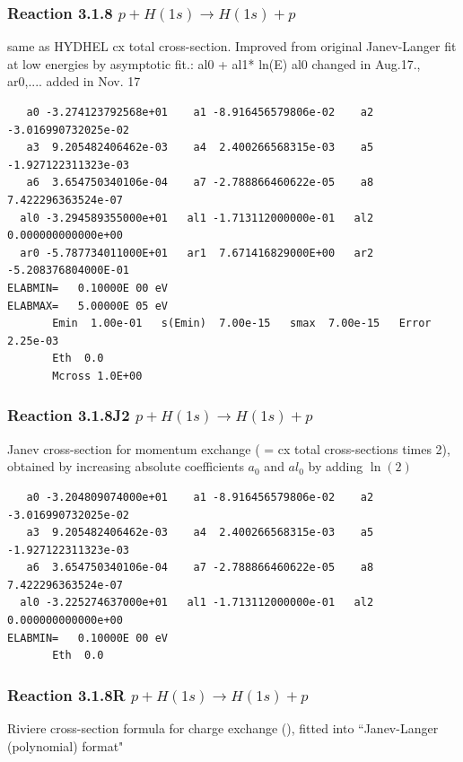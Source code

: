\documentclass[12pt,dvipdfmx]{article}
\begin{document}
\subsubsection{
Reaction 3.1.8 $  p + H(1s) \rightarrow H(1s) + p  $
}
same as HYDHEL cx total cross-section.
Improved from original Janev-Langer fit at low energies by asymptotic fit.:  al0 + al1* ln(E)
al0 changed in Aug.17., ar0,.... added in Nov. 17

\begin{small}\begin{verbatim}
   a0 -3.274123792568e+01    a1 -8.916456579806e-02    a2 -3.016990732025e-02
   a3  9.205482406462e-03    a4  2.400266568315e-03    a5 -1.927122311323e-03
   a6  3.654750340106e-04    a7 -2.788866460622e-05    a8  7.422296363524e-07
  al0 -3.294589355000e+01   al1 -1.713112000000e-01   al2  0.000000000000e+00
  ar0 -5.787734011000E+01   ar1  7.671416829000E+00   ar2 -5.208376804000E-01
ELABMIN=   0.10000E 00 eV
ELABMAX=   5.00000E 05 eV
       Emin  1.00e-01   s(Emin)  7.00e-15   smax  7.00e-15   Error  2.25e-03
       Eth  0.0
       Mcross 1.0E+00
\end{verbatim}\end{small}
\subsubsection{
Reaction 3.1.8J2 $  p + H(1s) \rightarrow H(1s) + p  $
}
Janev cross-section for momentum exchange ( = cx total cross-sections times 2), obtained by
increasing absolute coefficients $a_0$ and $al_0$  by adding $\ln(2)$

\begin{small}\begin{verbatim}
   a0 -3.204809074000e+01    a1 -8.916456579806e-02    a2 -3.016990732025e-02
   a3  9.205482406462e-03    a4  2.400266568315e-03    a5 -1.927122311323e-03
   a6  3.654750340106e-04    a7 -2.788866460622e-05    a8  7.422296363524e-07
  al0 -3.225274637000e+01   al1 -1.713112000000e-01   al2  0.000000000000e+00
ELABMIN=   0.10000E 00 eV
       Eth  0.0
\end{verbatim}\end{small}
\subsubsection{
Reaction 3.1.8R $  p + H(1s) \rightarrow H(1s) + p  $
}
Riviere cross-section formula for charge exchange
(\cite{kn:Riviere}), fitted into
``Janev-Langer (polynomial) format" \cite{kn:Janev}
\end{document}
